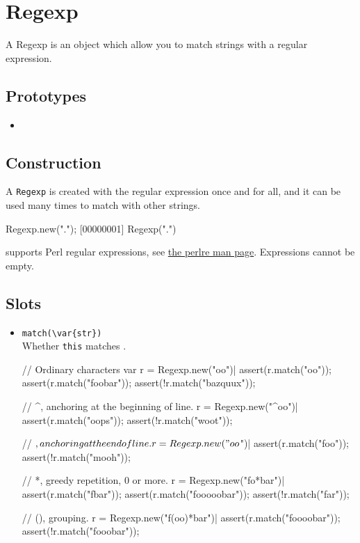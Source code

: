 \section{Regexp}

A Regexp is an object which allow you to match strings with a regular
expression.

\subsection{Prototypes}
\begin{itemize}
\item {}
\end{itemize}

\subsection{Construction}
\label{stdlib:regexp:ctor}

A \lstinline{Regexp} is created with the regular expression once and
for all, and it can be used many times to match with other strings.

\begin{urbiscript}
Regexp.new(".");
[00000001] Regexp(".")
\end{urbiscript}

\us supports Perl regular expressions, see
\href{http://perldoc.perl.org/perlre.html}{the perlre man page}.
Expressions cannot be empty.

\subsection{Slots}
\begin{itemize}
\item \lstinline|match(\var{str})|\\
  Whether \lstinline|this| matches .
\begin{urbiscript}[firstnumber=last]
// Ordinary characters
var r = Regexp.new("oo")|
assert(r.match("oo"));
assert(r.match("foobar"));
assert(!r.match("bazquux"));

// ^, anchoring at the beginning of line.
r = Regexp.new("^oo")|
assert(r.match("oops"));
assert(!r.match("woot"));

// $, anchoring at the end of line.
r = Regexp.new("oo$")|
assert(r.match("foo"));
assert(!r.match("mooh"));

// *, greedy repetition, 0 or more.
r = Regexp.new("fo*bar")|
assert(r.match("fbar"));
assert(r.match("fooooobar"));
assert(!r.match("far"));

// (), grouping.
r = Regexp.new("f(oo)*bar")|
assert(r.match("foooobar"));
assert(!r.match("fooobar"));
\end{urbiscript}

\end{itemize}

